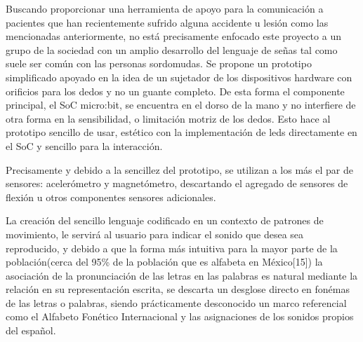 \hfill \break
\justifying
Buscando proporcionar una herramienta de apoyo para la comunicación a pacientes que han recientemente sufrido alguna accidente u lesión como las mencionadas anteriormente, no está precisamente enfocado este proyecto a un grupo de la sociedad con un amplio desarrollo del lenguaje de señas tal como suele ser común con las personas sordomudas. Se propone un prototipo simplificado apoyado en la idea de un sujetador de los dispositivos hardware con orificios para los dedos y no un guante completo. De esta forma el componente principal, el SoC micro:bit, se encuentra en el dorso de la mano y no interfiere de otra forma en la sensibilidad, o limitación motriz de los dedos. Esto hace al prototipo sencillo de usar, estético con la implementación de leds directamente en el SoC y sencillo para la interacción.

\hfill \break
\justifying
Precisamente y debido a la sencillez del prototipo, se utilizan a los más el par de sensores: acelerómetro y magnetómetro, descartando el agregado de sensores de flexión u otros componentes sensores adicionales.

\hfill\break
\justifying
La creación del sencillo lenguaje codificado en un contexto de patrones de movimiento, le servirá al usuario para indicar el sonido que desea sea reproducido, y debido a que la forma más intuitiva para la mayor parte de la población(cerca del 95\% de la población que es alfabeta en México[15]) la asociación de la pronunciación de las letras en las palabras es natural mediante la relación en su representación escrita, se descarta un desglose directo en fonémas de las letras o palabras, siendo prácticamente desconocido un marco referencial como el Alfabeto Fonético Internacional y las asignaciones de los sonidos propios del español.